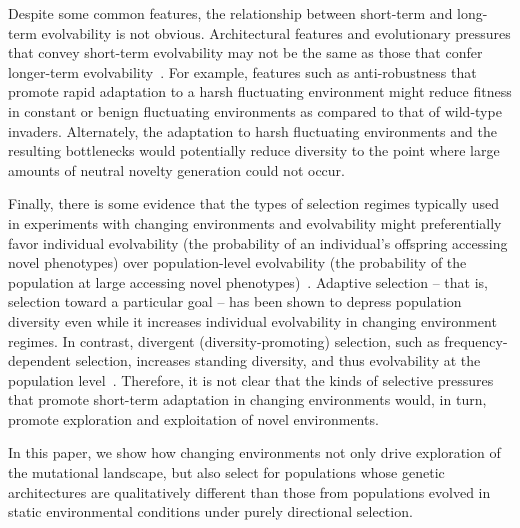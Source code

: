 \documentclass[10pt,letterpaper,final]{article}
\begin{document}
Despite some common features, the relationship between short-term and long-term evolvability is not obvious. Architectural features and evolutionary pressures that convey short-term evolvability may not be the same as those that confer longer-term evolvability~\cite{pigliucci_is_2008}. For example, features such as anti-robustness that promote rapid adaptation to a harsh fluctuating environment might reduce fitness in constant or benign fluctuating environments as compared to that of wild-type invaders. Alternately, the adaptation to harsh fluctuating environments and the resulting bottlenecks would potentially reduce diversity to the point where large amounts of neutral novelty generation could not occur. 

Finally, there is some evidence that the types of selection regimes typically used in experiments with changing environments and evolvability might preferentially favor individual evolvability (the probability of an individual's offspring accessing novel phenotypes) over population-level evolvability (the probability of the population at large accessing novel phenotypes)~\cite{wilder_reconciling_2015,lehman_critical_2016}. Adaptive selection -- that is, selection toward a particular goal -- has been shown to depress population diversity even while it increases individual evolvability in changing environment regimes. In contrast, divergent (diversity-promoting) selection, such as frequency-dependent selection, increases standing diversity, and thus evolvability at the population level~\cite{wilder_reconciling_2015}. Therefore, it is not clear that the kinds of selective pressures that promote short-term adaptation in changing environments would, in turn, promote exploration and exploitation of novel environments.

In this paper, we show how changing environments not only drive exploration of the mutational landscape, but also select for populations whose genetic architectures are qualitatively different than those from populations evolved in static environmental conditions under purely directional selection. 
\end{document}
